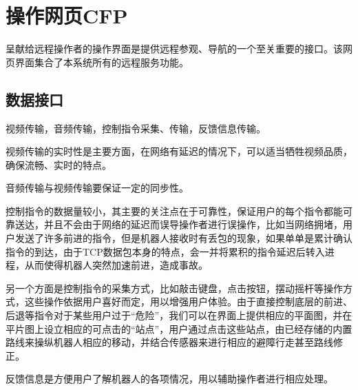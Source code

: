 

\clearpage
\section{操作网页CFP}

呈献给远程操作者的操作界面是提供远程参观、导航的一个至关重要的接口。该网页界面集合了本系统所有的远程服务功能。

\subsection{数据接口}

视频传输，音频传输，控制指令采集、传输，反馈信息传输。

视频传输的实时性是主要方面，在网络有延迟的情况下，可以适当牺牲视频品质，确保流畅、实时的特点。

音频传输与视频传输要保证一定的同步性。

控制指令的数据量较小，其主要的关注点在于可靠性，保证用户的每个指令都能可靠送达，并且不会由于网络的延迟而误导操作者进行误操作，比如当网络拥堵，用户发送了许多前进的指令，但是机器人接收时有丢包的现象，如果单单是累计确认指令的到达，由于TCP数据包本身的特点，会一并将累积的指令延迟后转入进程，从而使得机器人突然加速前进，造成事故。

另一个方面是控制指令的采集方式，比如敲击键盘，点击按钮，摆动摇杆等操作方式，这些操作依据用户喜好而定，用以增强用户体验。由于直接控制底层的前进、后退等指令对于某些用户过于“危险”，我们可以在界面上提供相应的平面图，并在平片图上设立相应的可点击的“站点”，用户通过点击这些站点，由已经存储的内置路线来操纵机器人相应的移动，并结合传感器来进行相应的避障行走甚至路线修正。

反馈信息是方便用户了解机器人的各项情况，用以辅助操作者进行相应处理。

